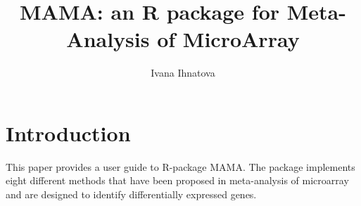 \documentclass[a4paper]{report}
\title{MAMA: an R package for Meta-Analysis of MicroArray}
\author{Ivana Ihnatova}
\begin{document}
\maketitle
\tableofcontents
\newpage
\chapter{Introduction}



This paper provides a user guide to R-package MAMA. The package implements eight different methods that have been proposed in meta-analysis of microarray and are designed to identify differentially expressed genes.\par
\end{document}
